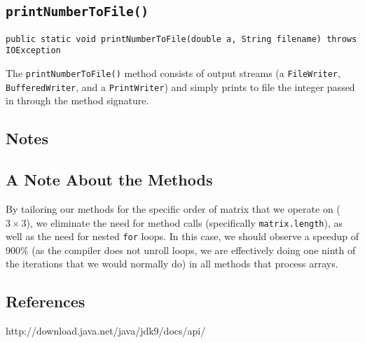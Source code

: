 \documentclass[12pt]{article}
\begin{document}
\subsection{\texttt{printNumberToFile()}}
\begin{verbatim}
public static void printNumberToFile(double a, String filename) throws IOException
\end{verbatim}
The \texttt{printNumberToFile()} method consists of output streams (a \texttt{FileWriter}, \texttt{BufferedWriter}, and a \texttt{PrintWriter}) and simply prints to file the integer passed in through the method signature.



\newpage %



\begin{center}
\section{Notes}
\end{center}
\subsection{A Note About the Methods}
By tailoring our methods for the specific order of matrix that we operate on ($3\times3$), we eliminate the need for method calls (specifically \texttt{matrix.length}), as well as the need for nested \texttt{for} loops. In this case, we should observe a speedup of 900\% (as the compiler does not unroll loops, we are effectively doing one ninth of the iterations that we would normally do) in all methods that process arrays.



\newpage %



\begin{center}
\section*{References}
\end{center}
http://download.java.net/java/jdk9/docs/api/
\end{document}
